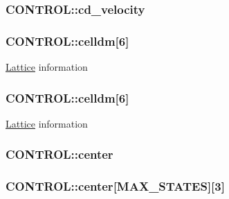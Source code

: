 \hypertarget{struct_c_o_n_t_r_o_l_ab3edaaa103273bbf49625be3ec139853}{
\subsubsection[{cd\-\_\-velocity}]{ C\-O\-N\-T\-R\-O\-L\-::cd\-\_\-velocity}}\label{struct_c_o_n_t_r_o_l_ab3edaaa103273bbf49625be3ec139853}
\hypertarget{struct_c_o_n_t_r_o_l_a01e6e29c4873d212e7b80f06d24bb7d0}{
\subsubsection[{celldm}]{ C\-O\-N\-T\-R\-O\-L\-::celldm\mbox{[}6\mbox{]}}}\label{struct_c_o_n_t_r_o_l_a01e6e29c4873d212e7b80f06d24bb7d0}
\hyperlink{class_lattice}{Lattice} information \hypertarget{struct_c_o_n_t_r_o_l_aa71d6fa590d34d107ed66887f37beef1}{
\subsubsection[{celldm}]{ C\-O\-N\-T\-R\-O\-L\-::celldm\mbox{[}6\mbox{]}}}\label{struct_c_o_n_t_r_o_l_aa71d6fa590d34d107ed66887f37beef1}
\hyperlink{class_lattice}{Lattice} information \hypertarget{struct_c_o_n_t_r_o_l_abb9da84a9a218b887da69d8b598bd727}{
\subsubsection[{center}]{ C\-O\-N\-T\-R\-O\-L\-::center}}\label{struct_c_o_n_t_r_o_l_abb9da84a9a218b887da69d8b598bd727}
\hypertarget{struct_c_o_n_t_r_o_l_af7035048aa78ea2c1cc56da176f35133}{
\subsubsection[{center}]{ C\-O\-N\-T\-R\-O\-L\-::center\mbox{[}{\bf M\-A\-X\-\_\-\-S\-T\-A\-T\-E\-S}\mbox{]}\mbox{[}3\mbox{]}}}\label{struct_c_o_n_t_r_o_l_af7035048aa78ea2c1cc56da176f35133}
